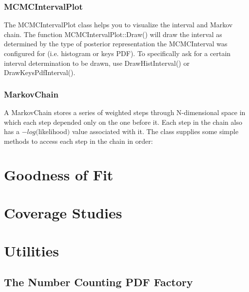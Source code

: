 \documentclass[11pt]{article}
\begin{document}
	\subsubsection{MCMCIntervalPlot}
	\label{sec:MCMCIntervalPlot}
	
	The MCMCIntervalPlot class helps you to visualize the interval and Markov chain.  The function MCMCIntervalPlot::Draw() will draw the interval as determined by the type of posterior representation the MCMCInterval was configured for (i.e. histogram or keys PDF).  To specifically ask for a certain interval determination to be drawn, use DrawHistInterval() or DrawKeysPdfInterval().
	
	
	
	\subsubsection{MarkovChain}
	\label{sec:MarkovChain}
	A MarkovChain stores a series of weighted steps through N-dimensional space in which each step depended only on the one before it.  Each step in the chain also has a $-log($likelihood$)$ value associated with it.  The class supplies some simple methods to access each step in the chain in order:
	
	
	

\section{Goodness of Fit}

\section{Coverage Studies}

\section{Utilities}

	\subsection{The Number Counting PDF Factory}
\end{document}
